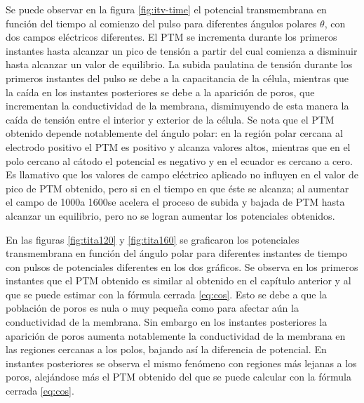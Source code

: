 Se puede observar en la figura \ref{fig:itv-time} el potencial transmembrana en función del tiempo al comienzo del pulso para diferentes ángulos polares $\theta$, con dos campos eléctricos diferentes. El PTM se incrementa durante los primeros instantes hasta alcanzar un pico de tensión a partir del cual comienza a disminuir hasta alcanzar un valor de equilibrio. La subida paulatina de tensión durante los primeros instantes del pulso se debe a la capacitancia de la célula, mientras que la caída en los instantes posteriores se debe a la aparición de poros, que incrementan la conductividad de la membrana, disminuyendo de esta manera la caída de tensión entre el interior y exterior de la célula. Se nota que el PTM obtenido depende notablemente del ángulo polar: en la región polar cercana al electrodo positivo el PTM es positivo y alcanza valores altos, mientras que en el polo cercano al cátodo el potencial es negativo y en el ecuador es cercano a cero. Es llamativo que los valores de campo eléctrico aplicado no influyen en el valor de pico de PTM obtenido, pero si en el tiempo en que éste se alcanza; al aumentar el campo de 1000\vcm a 1600\vcm se acelera el proceso de subida y bajada de PTM hasta alcanzar un equilibrio, pero no se logran aumentar los potenciales obtenidos.





En las figuras \ref{fig:tita120} y \ref{fig:tita160} se graficaron los potenciales transmembrana en función del ángulo polar para diferentes instantes de tiempo con pulsos de potenciales diferentes en los dos gráficos. Se observa en los primeros instantes que el PTM obtenido es similar al obtenido en el capítulo anterior y al que se puede estimar con la fórmula cerrada \ref{eq:cos}. Esto se debe a que la población de poros es nula o muy pequeña como para afectar aún la conductividad de la membrana. Sin embargo en los instantes posteriores la aparición de poros aumenta notablemente la conductividad de la membrana en las regiones cercanas a los polos, bajando así la diferencia de potencial. En instantes posteriores se observa el mismo fenómeno con regiones más lejanas a los poros, alejándose más el PTM obtenido del que se puede calcular con la fórmula cerrada \ref{eq:cos}.\\

